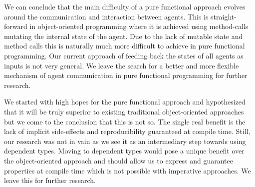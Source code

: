 We can conclude that the main difficulty of a pure functional approach evolves around the communication and interaction between agents. This is straight-forward in object-oriented programming where it is achieved using method-calls mutating the internal state of the agent.
Due to the lack of mutable state and method calls this is naturally much more difficult to achieve in pure functional programming. 
Our current approach of feeding back the states of all agents as inputs is not very general. We leave the search for a better and more flexible mechanism of agent communication in pure functional programming for further research.

\begin{comment}
Our current solution to the problem is the data-flow mechanism as implemented in section \ref{sec:step3_dataflow}. We have to admit that it is rather ad-hoc and may need some refinement and generalisation, also it is unclear if there are not better/more flexible mechanisms of agent communication and interaction in pure functional programming. We leave this for further research.
\end{comment}

We started with high hopes for the pure functional approach and hypothesized that it will be truly superior to existing traditional object-oriented approaches but we come to the conclusion that this is not so. The single real benefit is the lack of implicit side-effects and reproducibility guaranteed at compile time. Still, our research was not in vain as we see it as an intermediary step towards using dependent types. Moving to dependent types would pose a unique benefit over the object-oriented approach and should allow us to express and guarantee properties at compile time which is not possible with imperative approaches. We leave this for further research.